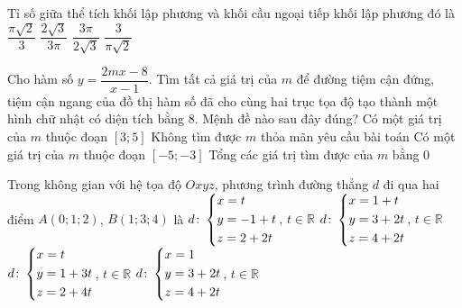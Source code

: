 \begin{ex}%
	Tỉ số giữa thể tích khối lập phương và khối cầu ngoại tiếp khối lập phương đó là
	\choice
	{$\dfrac{\pi \sqrt 2}{3}$}
	{\True $\dfrac{2\sqrt 3}{3\pi}$}
	{$\dfrac{3\pi}{2\sqrt 3}$}
	{$\dfrac{3}{\pi \sqrt 2}$}
\end{ex}

\begin{ex}%
	Cho hàm số $y=\dfrac{2mx-8}{x-1}$. Tìm tất cả giá trị của $m$ để đường tiệm cận đứng, tiệm cận ngang của đồ thị hàm số đã cho cùng hai trục tọa độ tạo thành một hình chữ nhật có diện tích bằng $8$. Mệnh đề nào sau đây đúng?
	\choice
	{Có một giá trị của $m$ thuộc đoạn $[3;5]$}
	{Không tìm được $m$ thỏa mãn yêu cầu bài toán}
	{\True Có một giá trị của $m$ thuộc đoạn $\left[- 5; - 3 \right]$}
	{Tổng các giá trị tìm được của $m$ bằng $0$}
\end{ex}

\begin{ex}%
	Trong không gian với hệ tọa độ $Oxyz$, phương trình đường thẳng $d$ đi qua hai điểm $A(0;1;2)$, $B(1;3;4)$ là
	\choice
	{$d\colon \left\{\begin{aligned}&x=t\\&y=-1+t\\&z=2+2t\end{aligned}\right.$, $t \in \mathbb{R}$}
	{\True $d \colon\left\{\begin{aligned}&x= 1+t\\&y=3+2t\\&z = 4+2t\end{aligned}\right.$, $t \in \mathbb{R}$}
	{$d\colon \left\{\begin{aligned}&x=t\\&y= 1+3t\\&z=2+4t\end{aligned}\right.$, $t \in \mathbb{R}$}
	{$d\colon \left\{\begin{aligned}&x=1\\&y=3+2t\\&z=4+2t\end{aligned}\right.$, $t \in \mathbb{R}$}
\end{ex}

